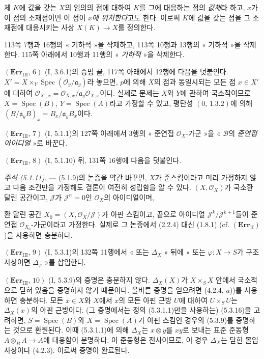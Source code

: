 체 $K$에 값을 갖는 $X$의 임의의 점에 대하여 $K$를 그에 대응하는
점의 \emph{값체}라 하고, $x$가 이 점의 소재점이면 이 점이
\emph{$x$에 위치한다}고도 한다. 이로써 $K$에 값을 갖는 점을 그
소재점에 대응시키는 사상 $X(K)\to X$를 정의한다.

113쪽 7행과 16행의 « 기하적 »을 삭제하고, 113쪽 10행과 13행의
« 기하적 »을 삭제한다. 115쪽 아래에서 10행과 11행의
« \emph{기하적} »을 삭제한다.

\noindent\textbf{$(\mathbf{Err}_{\mathrm{III}},\,6)$}
(I, 3.6.1)의 증명 끝, 117쪽 아래에서 12행에 다음을 덧붙인다.
$X'=X\times_Y\operatorname{Spec}(\mathscr O_y/\mathfrak a_y)$라 놓으면,
$p$에 의해 $X$의 점과 동일시되는 모든 점 $x\in X'$에 대하여
$\mathscr O_{X',x}=\mathscr O_{X,x}/\mathfrak a_y\mathscr O_{X,x}$이다.
실제로 문제는 $X$와 $Y$에 관하여 국소적이므로
$X=\operatorname{Spec}(B)$, $Y=\operatorname{Spec}(A)$라고 가정할 수 있고,
평탄성 $(0,\,1.3.2)$에 의해
$(B/\mathfrak a_yB)_x=B_x/\mathfrak a_yB_x$이다.

\noindent\textbf{$(\mathbf{Err}_{\mathrm{III}},\,7)$}
(I, 5.1.1)의 127쪽 아래에서 3행의 « 준연접 $\mathscr O_X$-가군 »을
« $\mathscr B$의 \emph{준연접 아이디얼} »로 바꾼다.

\noindent\textbf{$(\mathbf{Err}_{\mathrm{III}},\,8)$}
(I, 5.1.10) 뒤, 131쪽 16행에 다음을 덧붙인다.

\emph{주석 (5.1.11).} --- (5.1.9)의 논증을 약간 바꾸면, $X$가
준스킴이라고 미리 가정하지 않고 다음 조건만을 가정해도 결론이 여전히
성립함을 알 수 있다. $(X,\mathscr O_X)$가 국소환 달린 공간이고,
$\mathscr J$가 $\mathscr J^n=0$인 $\mathscr O_X$의 아이디얼이며,

환 달린 공간 $X_0=(X,\mathscr O_X/\mathscr J)$가 아핀 스킴이고, 끝으로
아이디얼 $\mathscr J^k/\mathscr J^{k+1}$들이 준연접
$\mathscr O_{X_0}$-가군이라고 가정한다. 실제로 그 논증에서 (2.2.4)
대신 (1.8.1) (cf. $(\mathbf{Err}_{\mathrm{II}})$)을 사용하면 충분하다.

\noindent\textbf{$(\mathbf{Err}_{\mathrm{III}},\,9)$}
(I, 5.3.1)의 132쪽 11행에서 « 또는 $\Delta_X$ » 뒤에
« 또는 $\varphi:X\to S$가 구조 사상이면 $\Delta_\varphi$ »를 삽입한다.

\noindent\textbf{$(\mathbf{Err}_{\mathrm{III}},\,10)$}
(I, 5.3.9)의 증명은 충분하지 않다. $\Delta_X(X)$가
$X\times_SX$ 안에서 국소적으로 닫혀 있음을 증명하지 않기 때문이다.
올바른 증명을 얻으려면 (4.2.4, $a$))를 사용하면 충분하다. 모든
$x\in X$와 $X$에서 $x$의 모든 아핀 근방 $U$에 대하여
$U\times_SU$는 $\Delta_X(x)$의 아핀 근방이다. (그 증명에서는 정의
(5.3.1.1)만을 사용하는) (5.3.16)을 고려하면,
$S=\operatorname{Spec}(B)$와 $X=\operatorname{Spec}(A)$가 아핀 스킴인
경우의 (5.3.9)를 증명하는 것으로 환원된다. 이때 (5.3.1.1)에 의해
$\Delta_X$는 $x\otimes y$를 $xy$로 보내는 표준 준동형
$A\otimes_BA\to A$에 대응함이 분명하다. 이 준동형은 전사이므로,
이 경우 $\Delta_X$는 닫힌 몰입 사상이다 (4.2.3). 이로써 증명이
완료된다.

